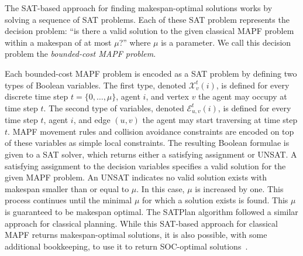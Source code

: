 \documentclass[review]{elsarticle}
\newcommand\roni[1]{\nb{\textbf{Roni:}}{green}{#1}}
\newcommand\pavel[1]{\nb{\textbf{Pavel:}}{blue}{#1}}
\newcommand{\mapf}{\ac{MAPF}\xspace}
\begin{document}
The SAT-based approach for finding makespan-optimal solutions works by solving a sequence of SAT problems. 
Each of these SAT problem represents the decision problem: ``is there a valid solution to the given classical \mapf problem within a makespan of at most $\mu$?'' where $\mu$ is a parameter. 
We call this decision problem the \emph{bounded-cost \mapf problem}.

Each bounded-cost \mapf problem is encoded as a SAT problem by defining two types of Boolean variables. The first type, denoted
$\mathcal{X}_{v}^{t}(i)$, is defined 
for every discrete time step $t=\{0,\ldots, \mu\}$, 
agent $i$, 
and vertex $v$ the agent may occupy at time step $t$. 
The second type of variables, denoted $\mathcal{E}_{u,v}^{t}(i)$, is defined 
for every time step $t$, agent $i$, 
and edge $(u,v)$ the agent may start traversing at time step $t$. 
\mapf movement rules and collision avoidance constraints are encoded on top of these variables as simple local constraints. 
The resulting Boolean formulae is given to a SAT solver, which returns either a satisfying assignment or UNSAT. A satisfying assignment to the decision variables specifies a valid solution for the given \mapf problem. An UNSAT indicates no valid solution exists with makespan smaller than or equal to $\mu$. 
In this case, $\mu$ is increased by one. This process continues until the minimal $\mu$ for which a solution exists is found. This $\mu$ is guaranteed to be makespan optimal. 
The SATPlan algorithm  \cite{DBLP:conf/ecai/KautzS92,DBLP:conf/ijcai/KautzS99} followed a similar approach for classical planning. 
While this SAT-based approach for classical \mapf returns makespan-optimal solutions, it is also possible, with some additional bookkeeping, to use it to return SOC-optimal solutions~\cite{DBLP:conf/ecai/SurynekFSB16}. 
\end{document}

